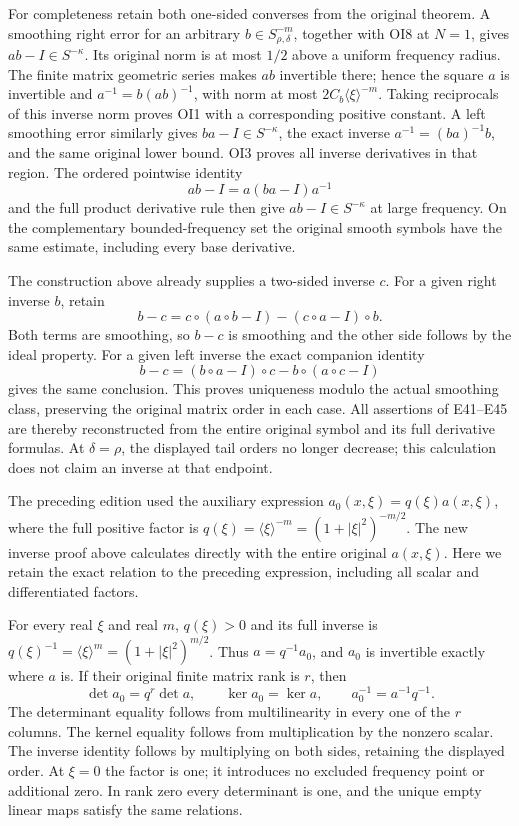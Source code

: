 \documentclass[
  11pt,
]{article}
\begin{document}
For completeness retain both one-sided converses from the original
theorem. A smoothing right error for an arbitrary
\(b\in S^{-m}_{\rho,\delta}\), together with OI8 at \(N=1\), gives
\(ab-I\in S^{-\kappa}\). Its original norm is at most \(1/2\) above a
uniform frequency radius. The finite matrix geometric series makes
\(ab\) invertible there; hence the square \(a\) is invertible and
\(a^{-1}=b(ab)^{-1}\), with norm at most \(2C_b\langle\xi\rangle^{-m}\).
Taking reciprocals of this inverse norm proves OI1 with a corresponding
positive constant. A left smoothing error similarly gives
\(ba-I\in S^{-\kappa}\), the exact inverse \(a^{-1}=(ba)^{-1}b\), and
the same original lower bound. OI3 proves all inverse derivatives in
that region. The ordered pointwise identity \[
ab-I=a(ba-I)a^{-1}
\tag{OI14}
\] and the full product derivative rule then give
\(ab-I\in S^{-\kappa}\) at large frequency. On the complementary
bounded-frequency set the original smooth symbols have the same
estimate, including every base derivative.

The construction above already supplies a two-sided inverse \(c\). For a
given right inverse \(b\), retain \[
b-c=c\circ(a\circ b-I)-(c\circ a-I)\circ b .
\tag{OI15}
\] Both terms are smoothing, so \(b-c\) is smoothing and the other side
follows by the ideal property. For a given left inverse the exact
companion identity \[
b-c=(b\circ a-I)\circ c-b\circ(a\circ c-I)
\tag{OI16}
\] gives the same conclusion. This proves uniqueness modulo the actual
smoothing class, preserving the original matrix order in each case. All
assertions of E41--E45 are thereby reconstructed from the entire
original symbol and its full derivative formulas. At \(\delta=\rho\),
the displayed tail orders no longer decrease; this calculation does not
claim an inverse at that endpoint.

The preceding edition used the auxiliary expression
\(a_0(x,\xi)=q(\xi)a(x,\xi)\), where the full positive factor is
\(q(\xi)=\langle\xi\rangle^{-m}=(1+|\xi|^2)^{-m/2}\). The new inverse
proof above calculates directly with the entire original \(a(x,\xi)\).
Here we retain the exact relation to the preceding expression, including
all scalar and differentiated factors.

For every real \(\xi\) and real \(m\), \(q(\xi)>0\) and its full inverse
is \(q(\xi)^{-1}=\langle\xi\rangle^m=(1+|\xi|^2)^{m/2}\). Thus
\(a=q^{-1}a_0\), and \(a_0\) is invertible exactly where \(a\) is. If
their original finite matrix rank is \(r\), then \[
\det a_0=q^r\det a,\qquad
\ker a_0=\ker a,\qquad
a_0^{-1}=a^{-1}q^{-1}.
\tag{OC1}
\] The determinant equality follows from multilinearity in every one of
the \(r\) columns. The kernel equality follows from multiplication by
the nonzero scalar. The inverse identity follows by multiplying on both
sides, retaining the displayed order. At \(\xi=0\) the factor is one; it
introduces no excluded frequency point or additional zero. In rank zero
every determinant is one, and the unique empty linear maps satisfy the
same relations.
\end{document}
